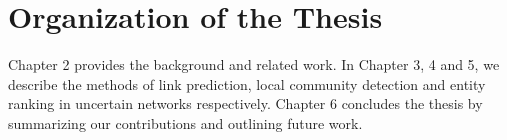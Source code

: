 \documentclass[\main/thesis.tex]{subfiles}
\begin{document}
\section{Organization of the Thesis}

Chapter 2 provides the background and related work. In Chapter 3, 4 and 5, we describe the methods of link prediction, local community detection and entity ranking in uncertain networks respectively. Chapter 6 concludes the thesis by summarizing our contributions and outlining future work.







\end{document}
